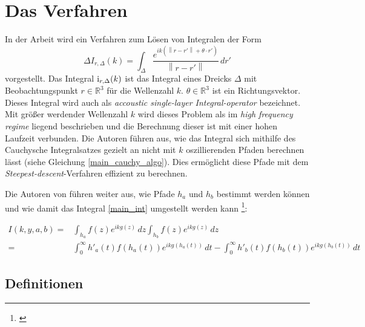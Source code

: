\chapter{Das Verfahren}\label{algo}


In der Arbeit \cite{gasperini:hal-03209144} wird ein Verfahren zum Lösen von Integralen der Form
\begin{equation}
    \label{main_int}
    \Delta
    I_{r,\Delta}(k) = \int_{\Delta}^{}  \frac{e^{ik(\left\lVert r-r'\right\rVert + \theta \cdot r')}}{\left\lVert r-r'\right\rVert} \,dr'
\end{equation}
vorgestellt. Das Integral ${\rm i}_{r,\Delta}(k)$ ist das Integral eines Dreicks $\Delta$ mit Beobachtungspunkt $r \in \mathbb{R}^3$ für die Wellenzahl $k$. $\theta \in \mathbb{R}^3$ ist ein Richtungsvektor.
Dieses Integral wird auch als \textit{accoustic single-layer Integral-operator} bezeichnet.
Mit größer werdender Wellenzahl $k$ wird dieses Problem als im \textit{high frequency regime} liegend beschrieben und die Berechnung dieser ist mit einer hohen Laufzeit verbunden.
Die Autoren führen aus, wie das Integral sich mithilfe des Cauchysche Integralsatzes gezielt an nicht mit $k$ oszillierenden Pfaden berechnen lässt (siehe Gleichung \ref{main_cauchy_algo}).
Dies ermöglicht diese Pfade mit dem \textit{Steepest-descent}-Verfahren effizient zu berechnen.

Die Autoren von \cite{gasperini:hal-03209144} führen weiter aus, wie Pfade $h_a$ und $h_b$ bestimmt werden können und
 wie damit das Integral \ref{main_int} umgestellt werden kann \footnote{\cite[Kaptiel 1, Gleichung 4]{gasperini:hal-03209144}}:

\begin{equation}
    \label{main_cauchy_algo}
    \begin{aligned}
        I(k,y,a,b) = & \int_{h_a}^{} f(z) e^{ikg(z)} \,dz  \int_{h_b}^{} f(z) e^{ikg(z)} \,dz \\
        = & \int_{0}^{\infty} h'_a(t)f(h_a(t))e^{ikg(h_a(t))} \,dt -\int_{0}^{\infty} h'_b(t)f(h_b(t))e^{ikg(h_b(t))} \,dt 
    \end{aligned}
\end{equation}

\section{Definitionen}

